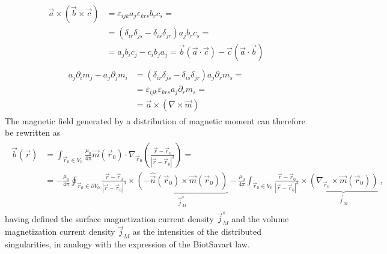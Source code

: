 \documentclass[letterpaper,10pt,english]{jupyterBook}
\begin{document}
\begin{equation*}
\begin{split}\begin{aligned}
  \vec{a} \times (\vec{b} \times \vec{c}) & = \varepsilon_{ijk} a_j \varepsilon_{krs} b_r c_s = \\
  & = (\delta_{ir} \delta_{js} - \delta_{is} \delta_{jr}) a_j b_r c_s = \\
  & = a_j b_i c_j - c_i b_j a_j = \vec{b}(\vec{a} \cdot \vec{c}) - \vec{c} (\vec{a} \cdot \vec{b})
\end{aligned}\end{split}
\end{equation*}\begin{equation*}
\begin{split}\begin{aligned}
 a_j \partial_i m_j - a_j \partial_j m_i
 & = (\delta_{ir} \delta_{js} - \delta_{is} \delta_{jr}) a_j \partial_r m_s = \\
 & = \varepsilon_{ijk} \varepsilon_{krs} a_j \partial_r m_s = \\
 & = \vec{a} \times \left( \nabla \times \vec{m} \right)
\end{aligned}\end{split}
\end{equation*}
\sphinxAtStartPar
The magnetic field generated by a distribution of magnetic moment can therefore be rewritten as
\begin{equation*}
\begin{split}\begin{aligned}
\vec{b}(\vec{r})
  & = \int_{\vec{r}_0 \in V_0} \frac{\mu_0}{4 \pi } \vec{m}(\vec{r}_0) \cdot \nabla_{\vec{r}_0}  \left( \frac{\vec{r} - \vec{r}_0}{|\vec{r} - \vec{r}_0|^3} \right) = \\
  & = - \frac{\mu_0}{4\pi} \oint_{\vec{r}_0 \in \partial V_0} \frac{\vec{r} - \vec{r}_0}{|\vec{r} - \vec{r}_0|^3} \times \underbrace{ \left( - \hat{\vec{n}}(\vec{r}_0) \times \vec{m}(\vec{r}_0) \right) }_{\vec{j}^s_M}
  - \frac{\mu_0}{4 \pi} \int_{\vec{r}_0 \in V_0} \frac{\vec{r} - \vec{r}_0}{|\vec{r}-\vec{r}_0|^3} \times \underbrace{ \left(\nabla_{\vec{r}_0} \times \vec{m}(\vec{r}_0) \right)}_{\vec{j}_M} \ ,
\end{aligned}\end{split}
\end{equation*}
\sphinxAtStartPar
having defined the surface magnetization current density \(\vec{j}^s_M\) and the volume magnetization current density \(\vec{j}_M\) as the intensities of the distributed singularities, in analogy with the expression of the Biot\sphinxhyphen{}Savart law.
\end{document}
